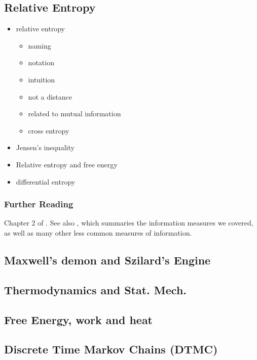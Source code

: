 \documentclass[Lectures.tex]{subfiles}
\begin{document}
\subsection*{Relative Entropy}
\begin{itemize}
\item relative entropy
\begin{itemize}
\item  naming
\item notation
\item  intuition
\item  not a distance
\item  related to mutual information
\item  cross entropy
\end{itemize}
\item Jensen’s inequality
\item Relative entropy and free energy
\item differential entropy
\end{itemize}

\subsubsection{Further Reading}
Chapter 2 of . See also , which summaries the information measures we covered, as well as many other less common measures of information.


\subsection{Maxwell's demon and Szilard's Engine}

\subsection{Thermodynamics and Stat. Mech.}

\subsection{Free Energy, work and heat}

\subsection{Discrete Time Markov Chains (DTMC)}
\end{document}

